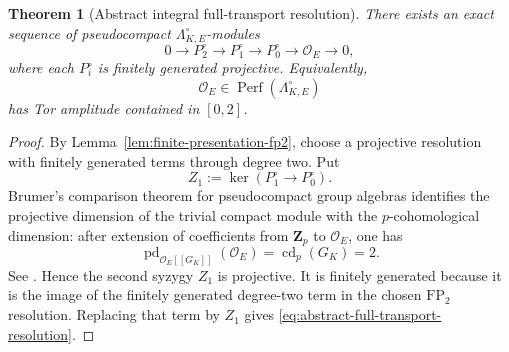 \documentclass[11pt]{article}
\newtheorem{theorem}{Theorem}[section]
\theoremstyle{definition}
\begin{document}
\begin{theorem}[Abstract integral full-transport resolution]\label{thm:abstract-full-transport-resolution}
There exists an exact sequence of pseudocompact $\Lambda_{K,E}^{\circ}$-modules
\begin{equation}\label{eq:abstract-full-transport-resolution}
0\longrightarrow P_2^{\circ}
\longrightarrow P_1^{\circ}
\longrightarrow P_0^{\circ}
\longrightarrow\mathcal O_E
\longrightarrow0,
\end{equation}
where each $P_i^{\circ}$ is finitely generated projective.  Equivalently,
\[
\mathcal O_E\in\operatorname{Perf}(\Lambda_{K,E}^{\circ})
\]
has Tor amplitude contained in $[0,2]$.
\end{theorem}

\begin{proof}
By Lemma~\ref{lem:finite-presentation-fp2}, choose a projective resolution with finitely generated terms through degree two.  Put
\[
Z_1:=\ker(P_1^{\circ}\to P_0^{\circ}).
\]
Brumer's comparison theorem for pseudocompact group algebras identifies the projective dimension of the trivial compact module with the $p$-cohomological dimension: after extension of coefficients from $\mathbf Z_p$ to $\mathcal O_E$, one has
\[
\operatorname{pd}_{\mathcal O_E[[G_K]]}(\mathcal O_E)
=
\operatorname{cd}_p(G_K)
=2.
\]
See \cite{Brumer,NSW}.  Hence the second syzygy $Z_1$ is projective.  It is finitely generated because it is the image of the finitely generated degree-two term in the chosen $\mathrm{FP}_2$ resolution.  Replacing that term by $Z_1$ gives \eqref{eq:abstract-full-transport-resolution}.
\end{proof}
\end{document}
